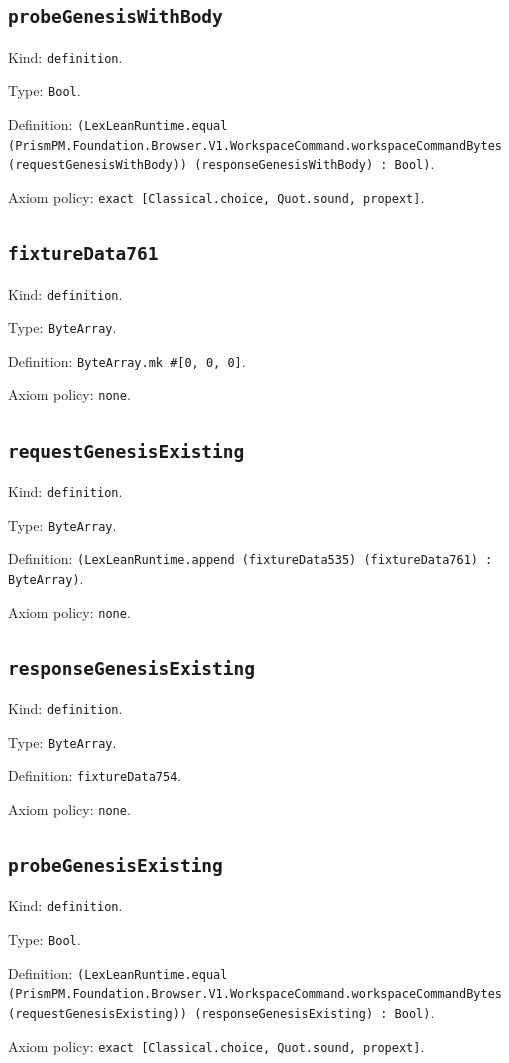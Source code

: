 \documentclass[11pt]{article}
\begin{document}
\subsection*{\texttt{probeGenesisWithBody}}
\noindent Kind: \texttt{definition}.\par
\noindent Type: \texttt{Bool}.\par
\noindent Definition: \texttt{(LexLeanRuntime.equal (PrismPM.Foundation.Browser.V1.WorkspaceCommand.workspaceCommandBytes (requestGenesisWithBody)) (responseGenesisWithBody) : Bool)}.\par
\noindent Axiom policy: \texttt{exact [Classical.choice, Quot.sound, propext]}.\par
\subsection*{\texttt{fixtureData761}}
\noindent Kind: \texttt{definition}.\par
\noindent Type: \texttt{ByteArray}.\par
\noindent Definition: \texttt{ByteArray.mk \#[0, 0, 0]}.\par
\noindent Axiom policy: \texttt{none}.\par
\subsection*{\texttt{requestGenesisExisting}}
\noindent Kind: \texttt{definition}.\par
\noindent Type: \texttt{ByteArray}.\par
\noindent Definition: \texttt{(LexLeanRuntime.append (fixtureData535) (fixtureData761) : ByteArray)}.\par
\noindent Axiom policy: \texttt{none}.\par
\subsection*{\texttt{responseGenesisExisting}}
\noindent Kind: \texttt{definition}.\par
\noindent Type: \texttt{ByteArray}.\par
\noindent Definition: \texttt{fixtureData754}.\par
\noindent Axiom policy: \texttt{none}.\par
\subsection*{\texttt{probeGenesisExisting}}
\noindent Kind: \texttt{definition}.\par
\noindent Type: \texttt{Bool}.\par
\noindent Definition: \texttt{(LexLeanRuntime.equal (PrismPM.Foundation.Browser.V1.WorkspaceCommand.workspaceCommandBytes (requestGenesisExisting)) (responseGenesisExisting) : Bool)}.\par
\noindent Axiom policy: \texttt{exact [Classical.choice, Quot.sound, propext]}.\par
\end{document}
